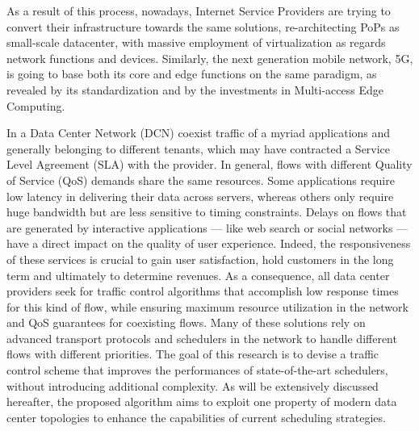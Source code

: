 As a result of this process, nowadays, Internet Service Providers are trying to convert their infrastructure towards the same solutions, re-architecting PoPs as small-scale datacenter, with massive employment of virtualization as regards network functions and devices. Similarly, the next generation mobile network, 5G, is going to base both its core and edge functions on the same paradigm, as revealed by its standardization and by the investments in Multi-access Edge Computing. 

In a Data Center Network (DCN) coexist traffic of a myriad applications and generally belonging to different tenants, which may have contracted a Service Level Agreement (SLA) with the provider. In general, flows with different Quality of Service (QoS) demands share the same resources. Some applications require low latency in delivering their data across servers, whereas others only require huge bandwidth but are less sensitive to timing constraints. Delays on flows that are generated by interactive applications --- like web search or social networks --- have a direct impact on the quality of user experience. Indeed, the responsiveness of these services is crucial to gain user satisfaction, hold customers in the long term and ultimately to determine revenues. As a consequence, all data center providers seek for traffic control algorithms that accomplish low response times for this kind of flow, while ensuring maximum resource utilization in the network and QoS guarantees for coexisting flows. Many of these solutions rely on advanced transport protocols and schedulers in the network to handle different flows with different priorities. The goal of this research is to devise a traffic control scheme that improves the performances of state-of-the-art schedulers, without introducing additional complexity. As will be extensively discussed hereafter, the proposed algorithm aims to exploit one property of modern data center topologies to enhance the capabilities of current scheduling strategies. 


